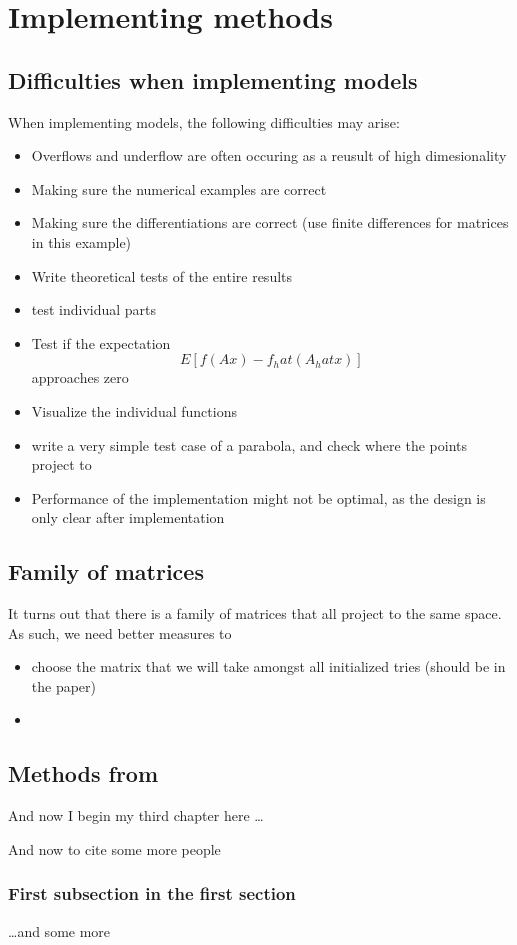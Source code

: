 \chapter{Implementing methods}

\ifpdf
    \graphicspath{{Chapter3/Figs/Raster/}{Chapter3/Figs/PDF/}{Chapter3/Figs/}}
\else
    \graphicspath{{Chapter3/Figs/Vector/}{Chapter3/Figs/}}
\fi

\section{Difficulties when implementing models}
When implementing models, the following difficulties may arise:

\begin{itemize}
\item Overflows and underflow are often occuring as a reusult of high dimesionality
\item Making sure the numerical examples are correct
\item Making sure the differentiations are correct (use finite differences for matrices in this example)
\item Write theoretical tests of the entire results
\item test individual parts
\item Test if the expectation $$ E[ f(A x) - f_hat(A_hat x) ] $$ approaches zero
\item Visualize the individual functions
\item write a very simple test case of a parabola, and check where the points project to
\item Performance of the implementation might not be optimal, as the design is only clear after implementation
\end{itemize}

\section{Family of matrices}
It turns out that there is a family of matrices that all project to the same space.
As such, we need better measures to 
\begin{itemize}
\item choose the matrix that we will take amongst all initialized tries (should be in the paper)
\item 
\end{itemize}

\section{Methods from }
And now I begin my third chapter here \dots

And now to cite some more people~\citet{Rea85,Ancey1996}

\subsection{First subsection in the first section}
\dots and some more 


